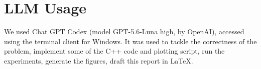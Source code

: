 \documentclass[conference]{IEEEtran}
\begin{document}




\section{LLM Usage}

We used Chat GPT Codex (model GPT-5.6-Luna high, by OpenAI),
accessed using the terminal client for Windows.
It was used to tackle the correctness of the problem, implement
some of the C++ code and plotting script, run the experiments,
generate the figures, draft this report in LaTeX.
\end{document}

